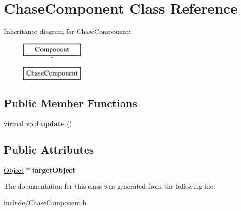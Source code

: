\hypertarget{class_chase_component}{\section{Chase\-Component Class Reference}
\label{class_chase_component}
}
Inheritance diagram for Chase\-Component\-:\begin{figure}[H]
\begin{center}
\leavevmode
\includegraphics[height=2.000000cm]{class_chase_component}
\end{center}
\end{figure}
\subsection*{Public Member Functions}
\begin{DoxyCompactItemize}
\item 
\hypertarget{class_chase_component_addceaf5e1eb87900d5e9bd7b9f7253c4}{virtual void {\bfseries update} ()}\label{class_chase_component_addceaf5e1eb87900d5e9bd7b9f7253c4}

\end{DoxyCompactItemize}
\subsection*{Public Attributes}
\begin{DoxyCompactItemize}
\item 
\hypertarget{class_chase_component_ada938361ce8349f5586e2b3b8cdc1f0c}{\hyperlink{class_object}{Object} $\ast$ {\bfseries target\-Object}}\label{class_chase_component_ada938361ce8349f5586e2b3b8cdc1f0c}

\end{DoxyCompactItemize}


The documentation for this class was generated from the following file\-:\begin{DoxyCompactItemize}
\item 
include/Chase\-Component.\-h\end{DoxyCompactItemize}
